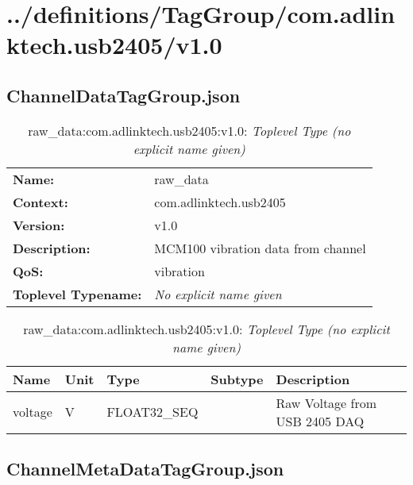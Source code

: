 \section{../definitions/TagGroup/com.adlinktech.usb2405/v1.0}
\subsection{ChannelDataTagGroup.json}

\begin{table}[H]
\begin{tabularx}{\textwidth}{l X} 
       \textbf{Name:} & raw\_data \\ 
	   \textbf{Context:} & com.adlinktech.usb2405 \\ 
	   \textbf{Version:} & v1.0 \\ 
	   \textbf{Description:} & MCM100 vibration data from channel \\ 
	   \textbf{QoS:} & vibration \\
	   \textbf{Toplevel Typename:} & \textit{No explicit name given} \\ 
\end{tabularx}
\caption{raw\_data:com.adlinktech.usb2405:v1.0}\label{ChannelDataTagGroup.json:table:raw-underscore-data}
\bigskip
\begin{tabularx}{\textwidth}{l l l l X} 
	 \textbf{Name} & \textbf{Unit} & \textbf{Type} & \textbf{Subtype} & \textbf{Description} \\
	 \midrule
   voltage & V & FLOAT32\_SEQ &  & Raw Voltage from USB 2405 DAQ \\
\end{tabularx}
\caption{raw\_data:com.adlinktech.usb2405:v1.0: \textit{Toplevel Type (no explicit name given)}}\label{ChannelDataTagGroup.json:table:raw-underscore-data-no-type-given}


\end{table}

\subsection{ChannelMetaDataTagGroup.json}

